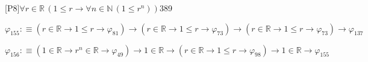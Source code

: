 \begin{fullproof}{[P8]}{$\forall r \in \mathbb{R}\,(1 \leq r \to \forall n \in \mathbb{N}\,(1 \leq {{r}^{n}}))$}{389}
\begin{abbrevlist}
\item $\varphi_{155} :\equiv (r \in \mathbb{R} \to 1 \leq r \to \varphi_{81}) \to (r \in \mathbb{R} \to 1 \leq r \to \varphi_{73}) \to (r \in \mathbb{R} \to 1 \leq r \to \varphi_{73}) \to \varphi_{137}$
\item $\varphi_{156} :\equiv (1 \in \mathbb{R} \to {{r}^{n}} \in \mathbb{R} \to \varphi_{49}) \to 1 \in \mathbb{R} \to (r \in \mathbb{R} \to 1 \leq r \to \varphi_{98}) \to 1 \in \mathbb{R} \to \varphi_{155}$
\end{abbrevlist}
\end{fullproof}
